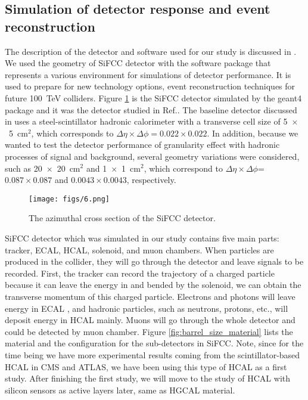 \documentclass[12pt,twoside,a4paper,an,final]{cms-tdr}
\begin{document}
\subsection{Simulation of detector response and event reconstruction}
 
The description of the detector and software used for our study is discussed in \cite{Chekanov:2016ppq}. We used the geometry of SiFCC detector with the software package that represents a various environment for simulations of detector performance. It is used to prepare for new technology options, event reconstruction techniques for future 100~TeV colliders. Figure \ref{fig:SiFCC} is the SiFCC detector simulated by the {\sc geant4} package\cite{Allison2016186} and it was the detector studied in Ref.\cite{Chekanov:2016ppq}. The baseline detector discussed in \cite{Chekanov:2016ppq} uses a steel-scintillator hadronic calorimeter with a transverse cell size of 5~$\times$~5~cm$^2$, which corresponds to $\Delta \eta \times \Delta \phi = 0.022\times0.022$. In addition, because we wanted to test the detector performance of granularity effect with hadronic processes of signal and background, several geometry variations were considered, such as 20~$\times$~20~cm$^2$ and  1~$\times$~1~cm$^2$, which correspond to $\Delta \eta \times \Delta \phi$= $0.087\times0.087$ and  $0.0043\times0.0043$, respectively.\\

\begin{figure}
\begin{center}
\texttt{[image: figs/6.png]}
\end{center}
\caption{The azimuthal cross section of the SiFCC detector.}
\label{fig:SiFCC}
\end{figure}

SiFCC detector which was simulated in our study contains five main parts: tracker, ECAL, HCAL, solenoid, and muon chambers. When particles are produced in the collider, they will go through the detector and leave signals to be recorded. First, the tracker can record the trajectory of a charged particle because it can leave the energy in and bended by the solenoid, we can obtain the transverse momentum of this charged particle. Electrons and photons will leave energy in ECAL , and hadronic particles, such as neutrons, protons, etc., will deposit energy in HCAL mainly. Muons will go through the whole detector and could be detected by muon chamber. Figure \ref{fig:barrel_size_material} lists the material and the configuration for the sub-detectors in SiFCC. Note, since for the time being we have more experimental results coming from the scintillator-based HCAL in CMS and ATLAS, we have been using this type of HCAL as a first study. After finishing the first study, we will move to the study of HCAL with silicon sensors as active layers later, same as HGCAL material. 
\end{document}
